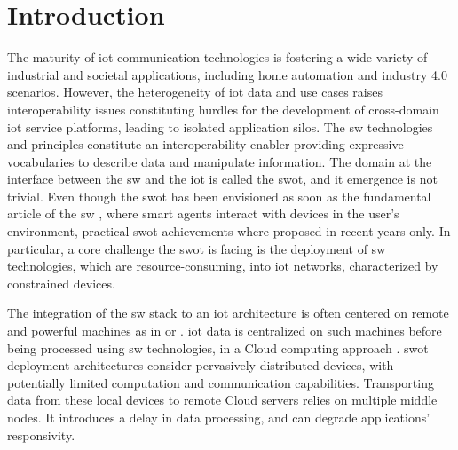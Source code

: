 \documentclass{iosart2c}
\begin{document}
\section{Introduction}

The maturity of \gls{iot} communication technologies is fostering a wide variety of industrial and societal applications, including home automation and industry 4.0 scenarios. 
However, the heterogeneity of \gls{iot} data and use cases raises interoperability issues constituting hurdles for the development of cross-domain \gls{iot} service platforms, leading to isolated application silos. 
The \gls{sw} technologies and principles constitute an interoperability enabler providing expressive vocabularies to describe data and manipulate information.
The domain at the interface between the \gls{sw} and the \gls{iot} is called the \gls{swot}, and it emergence is not trivial. 
Even though the \gls{swot} has been envisioned as soon as the fundamental article of the \gls{sw} \cite{Berners-Lee2001}, where smart agents interact with devices in the user's environment, practical \gls{swot} achievements where proposed in recent years only\cite{Pfisterer2011}.
In particular, a core challenge the \gls{swot} is facing is the deployment of \gls{sw} technologies, which are resource-consuming, into \gls{iot} networks, characterized by constrained devices. 

The integration of the \gls{sw} stack to an \gls{iot} architecture is often centered on remote and powerful machines as in \cite{Gyrard2017} or \cite{Wang2018}. 
\gls{iot} data is centralized on such machines before being processed using \gls{sw} technologies, in a Cloud computing approach \cite{Mell2011}.
\gls{swot} deployment architectures consider pervasively distributed devices, with potentially limited computation and communication capabilities. 
Transporting data from these local devices to remote Cloud servers relies on multiple middle nodes.
It introduces a delay in data processing, and can degrade applications' responsivity.
\end{document}

